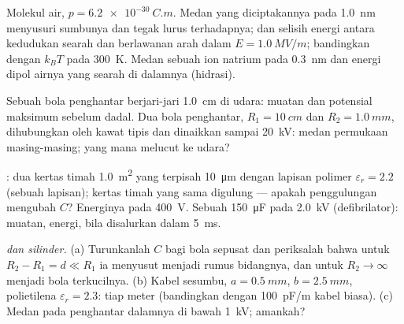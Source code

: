 \begin{exercise}[$\star\star$]\label{exo:b1:potential-capacitors:7}
Molekul air, $p = \qty{6.2e-30}{C.m}$. Medan yang diciptakannya pada \qty{1.0}{nm}
menyusuri sumbunya dan tegak lurus terhadapnya;  dan selisih energi
antara kedudukan searah dan berlawanan arah dalam $E = \qty{1.0}{MV/m}$;
bandingkan dengan $k_BT$ pada \qty{300}{K}. Medan sebuah ion natrium pada
\qty{0.3}{nm} dan energi dipol airnya yang searah di dalamnya (hidrasi).
\end{exercise}

\begin{exercise}[$\star\star$]\label{exo:b1:potential-capacitors:8}
Sebuah bola penghantar berjari-jari \qty{1.0}{cm} di udara: muatan dan potensial
maksimum sebelum dadal. Dua bola penghantar, $R_1 = \qty{10}{cm}$
dan $R_2 = \qty{1.0}{mm}$, dihubungkan oleh kawat tipis dan dinaikkan sampai
\qty{20}{kV}: medan permukaan masing-masing; yang mana melucut ke udara?
\end{exercise}

\begin{exercise}[$\star\star$]\label{exo:b1:potential-capacitors:9}
: dua kertas timah \qty{1.0}{m^2} yang terpisah \qty{10}{\micro m}
dengan lapisan polimer $\varepsilon_r = 2.2$ (sebuah  lapisan); kertas
timah yang sama digulung --- apakah penggulungan mengubah $C$? Energinya pada
\qty{400}{V}. Sebuah  \qty{150}{\micro F} pada \qty{2.0}{kV}
(defibrilator): muatan, energi,  bila disalurkan dalam \qty{5}{ms}.
\end{exercise}

\begin{exercise}[$\star\star\star$]\label{exo:b1:potential-capacitors:10}
\emph{ dan silinder.} (a) Turunkanlah $C$ bagi bola sepusat
dan periksalah bahwa untuk $R_2 - R_1 = d \ll R_1$ ia menyusut menjadi
rumus bidangnya, dan untuk $R_2 \to \infty$ menjadi bola terkucilnya.
(b) Kabel sesumbu, $a = \qty{0.5}{mm}$, $b = \qty{2.5}{mm}$, polietilena
$\varepsilon_r = 2.3$:  tiap meter (bandingkan dengan \qty{100}{pF/m}
kabel biasa). (c) Medan pada penghantar dalamnya di bawah
\qty{1}{kV}; amankah?
\end{exercise}

